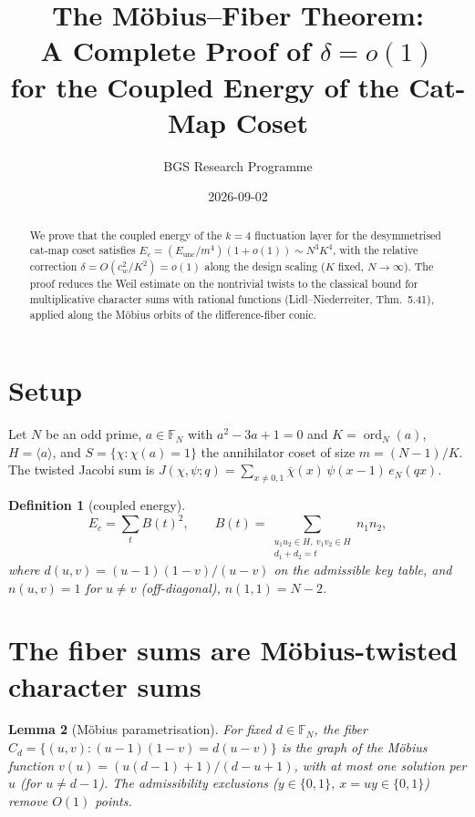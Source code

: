 \documentclass[11pt]{article}
\title{The M\"obius--Fiber Theorem:\\
  A Complete Proof of $\delta = o(1)$\\
  for the Coupled Energy of the Cat-Map Coset}
\author{BGS Research Programme}
\date{2026-09-02}
\newtheorem{lemma}{Lemma}[section]
\newtheorem{definition}[lemma]{Definition}
\begin{document}
\maketitle

\begin{abstract}
We prove that the coupled energy of the $k{=}4$ fluctuation layer for
the desymmetrised cat-map coset satisfies $E_c = (E_{\mathrm{unc}}/
m^4)(1 + o(1)) \sim N^3 K^4$, with the relative correction
$\delta = O(c_w^2/K^2) = o(1)$ along the design scaling ($K$ fixed,
$N \to \infty$).  The proof reduces the Weil estimate on the
nontrivial twists to the classical bound for multiplicative character
sums with rational functions (Lidl--Niederreiter, Thm.~5.41), applied
along the M\"obius orbits of the difference-fiber conic.
\end{abstract}

\section{Setup}\label{sec:setup}

Let $N$ be an odd prime, $a \in \mathbb{F}_N$ with $a^2 - 3a + 1 = 0$
and $K = \operatorname{ord}_N(a)$, $H = \langle a\rangle$, and
$S = \{\chi : \chi(a) = 1\}$ the annihilator coset of size
$m = (N{-}1)/K$.  The twisted Jacobi sum is
$J(\chi,\psi;q) = \sum_{x \neq 0,1} \overline{\chi}(x)\,
\psi(x{-}1)\,e_N(qx)$.

\begin{definition}[coupled energy]
\label{def:Ec}
\[
  E_c = \sum_t B(t)^2, \qquad
  B(t) = \sum_{\substack{u_1 u_2 \in H,\ v_1 v_2 \in H \\ d_1 + d_2 = t}}
        n_1 n_2,
\]
where $d(u,v) = (u{-}1)(1{-}v)/(u{-}v)$ on the admissible key table,
and $n(u,v) = 1$ for $u \neq v$ (off-diagonal), $n(1,1) = N{-}2$.
\end{definition}

\section{The fiber sums are M\"obius-twisted character sums}

\begin{lemma}[M\"obius parametrisation]\label{lem:mobius}
For fixed $d \in \mathbb{F}_N$, the fiber
$C_d = \{(u,v) : (u{-}1)(1{-}v) = d(u{-}v)\}$ is the graph of the
M\"obius function $v(u) = (u(d{-}1)+1)/(d{-}u+1)$, with at most one
solution per $u$ (for $u \neq d{-}1$).  The admissibility exclusions
($y \in \{0,1\}$, $x = uy \in \{0,1\}$) remove $O(1)$ points.
\end{lemma}
\end{document}
